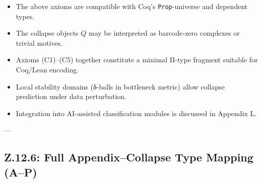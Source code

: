 \documentclass[11pt]{article}
\begin{document}
\begin{axiom}
\begin{axiom}
{{\begin{itemize}
  \item The above axioms are compatible with Coq’s \texttt{Prop}-universe and dependent types.
  \item The collapse objects \( Q \) may be interpreted as barcode-zero complexes or trivial motives.
  \item Axioms (C1)–(C5) together constitute a minimal Π-type fragment suitable for Coq/Lean encoding.
  \item Local stability domains (δ-balls in bottleneck metric) allow collapse prediction under data perturbation.
  \item Integration into AI-assisted classification modules is discussed in Appendix L.
\end{itemize}

---

\subsection*{Z.12.6: Full Appendix–Collapse Type Mapping (A–P)}

}}
\end{axiom}
\end{axiom}
\end{document}
